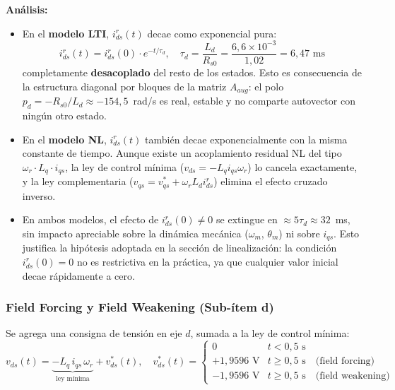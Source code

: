 \documentclass[12pt, a4paper,journal, onecolumn, compsoc]{IEEEtran}
\begin{document}
\textbf{Análisis:}
\begin{itemize}
    \item En el \textbf{modelo LTI}, $i_{ds}^r(t)$ decae como exponencial pura:
    \begin{equation}
        i_{ds}^r(t) = i_{ds}^r(0) \cdot e^{-t/\tau_d}, \quad \tau_d = \frac{L_d}{R_{s0}} = \frac{6{,}6 \times 10^{-3}}{1{,}02} = 6{,}47 \text{ ms}
    \end{equation}
    completamente \textbf{desacoplado} del resto de los estados. Esto es consecuencia de la estructura diagonal por bloques de la matriz $A_{aug}$: el polo $p_d = -R_{s0}/L_d \approx -154{,}5$~rad/s es real, estable y no comparte autovector con ningún otro estado.

    \item En el \textbf{modelo NL}, $i_{ds}^r(t)$ también decae exponencialmente con la misma constante de tiempo. Aunque existe un acoplamiento residual NL del tipo $\omega_r \cdot L_q \cdot i_{qs}$, la ley de control mínima ($v_{ds} = -L_q i_{qs} \omega_r$) lo cancela exactamente, y la ley complementaria ($v_{qs} = v_{qs}^* + \omega_r L_d i_{ds}^r$) elimina el efecto cruzado inverso.

    \item En ambos modelos, el efecto de $i_{ds}^r(0) \neq 0$ se extingue en $\approx 5\tau_d \approx 32$~ms, sin impacto apreciable sobre la dinámica mecánica ($\omega_m$, $\theta_m$) ni sobre $i_{qs}$. Esto justifica la hipótesis adoptada en la sección de linealización: la condición $i_{ds}^r(0) = 0$ no es restrictiva en la práctica, ya que cualquier valor inicial decae rápidamente a cero.
\end{itemize}

\subsubsection{Field Forcing y Field Weakening (Sub-ítem d)}
\label{sec:sim_item_d}

Se agrega una consigna de tensión en eje $d$, sumada a la ley de control mínima:
\begin{equation}
    v_{ds}(t) = \underbrace{-L_q \, i_{qs} \, \omega_r}_{\text{ley mínima}} + v_{ds}^*(t), \quad
    v_{ds}^*(t) = \begin{cases}
    0 & t < 0{,}5 \text{ s} \\
    +1{,}9596 \text{ V} & t \geq 0{,}5 \text{ s} \quad \text{(field forcing)}\\
    -1{,}9596 \text{ V} & t \geq 0{,}5 \text{ s} \quad \text{(field weakening)}
    \end{cases}
\end{equation}
\end{document}
